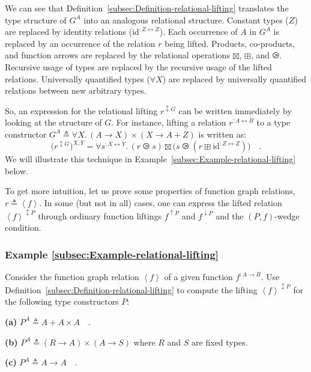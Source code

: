 We can see that Definition~\ref{subsec:Definition-relational-lifting}
translates the type structure of $G^{A}$ into an analogous relational
structure. Constant types ($Z$) are replaced by identity relations
($\text{id}^{:Z\leftrightarrow Z}$). Each occurrence of $A$ in $G^{A}$
is replaced by an occurrence of the relation $r$ being lifted. Products,
co-products, and function arrows are replaced by the relational operations
$\boxtimes$, $\boxplus$, and $\ogreaterthan$. Recursive usage of
types are replaced by the recursive usage of the lifted relations.
Universally quantified types ($\forall X$) are replaced by universally
quantified relations between new arbitrary types. 

So, an expression for the relational lifting $r^{\updownarrow G}$
can be written immediately by looking at the structure of $G$. For
instance, lifting a relation $r^{:A\leftrightarrow B}$ to a type
constructor $G^{A}\triangleq\forall X.\,\left(A\rightarrow X\right)\times\left(X\rightarrow A+Z\right)$
is written as:
\[
\big(r^{\updownarrow G}\big)^{X,Y}=\forall s^{:X\leftrightarrow Y}.\,(r\ogreaterthan s)\boxtimes\big(s\ogreaterthan(r\boxplus\text{id}^{:Z\leftrightarrow Z})\big)\quad.
\]
 We will illustrate this technique in Example~\ref{subsec:Example-relational-lifting}
below.

To get more intuition, let us prove some properties of function graph
relations, $r\triangleq\left<f\right>$. In some (but not in all)
cases, one can express the lifted relation $\left<f\right>^{\updownarrow P}$
through ordinary function liftings $f^{\uparrow P}$ and $f^{\downarrow P}$
and the $\left(P,f\right)$-wedge condition.

\subsubsection{Example \label{subsec:Example-relational-lifting}\ref{subsec:Example-relational-lifting}}

Consider the function graph relation $\left<f\right>$ of a given
function $f^{:A\rightarrow B}$. Use Definition~\ref{subsec:Definition-relational-lifting}
to compute the lifting $\left<f\right>^{\updownarrow P}$ for the
following type constructors $P$:

\textbf{(a)} $P^{A}\triangleq A+A\times A\quad$.

\textbf{(b)} $P^{A}\triangleq(R\rightarrow A)\times(A\rightarrow S)$
where $R$ and $S$ are fixed types.

\textbf{(c)} $P^{A}\triangleq A\rightarrow A\quad$.

